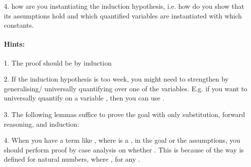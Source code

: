 \begin{isabellebody}
\begin{isamarkuptext}
 4. how are you instantiating the induction hypothesis, i.e. how do you show that its assumptions
    hold and which quantified variables are instantiated with which constants.

\paragraph{Hints:}
 1. The proof should be by induction

  2. If the induction hypothesis is too week, you might need to strengthen by generalising/
     universally quantifying over one of the variables. E.g. if you want to universally quantify on
     a variable , then you can use .

  3. The following lemmas suffice to prove the goal with only substitution, forward reasoning, and
     induction:


  4. When you have a term like , where  is a , in the goal or the assumptions, you 
     should perform proof by case analysis on whether . This is because of the way \isa{{\isacharminus}{\kern0pt}} is
     defined for natural numbers, where , for any .%
\end{isamarkuptext}\isamarkuptrue%
%
\isadelimproof
%
\endisadelimproof
%
\isatagproof
\isanewline
%
\endisatagproof
{\isafoldproof}%
%
\isadelimproof
%
\endisadelimproof
%
\isadelimtheory
%
\endisadelimtheory
%
\isatagtheory
%
\endisatagtheory
{\isafoldtheory}%
%
\isadelimtheory
%
\endisadelimtheory
%
\end{isabellebody}%
